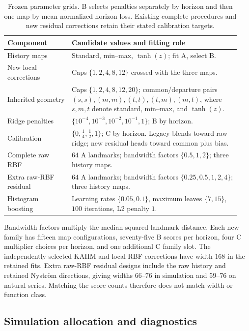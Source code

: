 \begin{table}[t]
\centering\small
\caption{Frozen parameter grids. B selects penalties separately by
horizon and then one map by mean normalized horizon loss. Existing
complete procedures and new residual corrections retain their stated
calibration targets.}
\label{supp:pa-grids}
\begin{tabular}{@{}p{0.26\linewidth}p{0.68\linewidth}@{}}
\toprule
Component & Candidate values and fitting role \\
\midrule
History maps & Standard, min--max, $\tanh(z)$; fit A, select B. \\
New local corrections & Caps $\{1,2,4,8,12\}$ crossed with the three maps. \\
Inherited geometry & Caps $\{1,2,4,8,12,20\}$; common/departure pairs
$(s,s),(m,m),(t,t),(t,m),(m,t)$, where $s,m,t$ denote standard,
min--max, and $\tanh(z)$. \\
Ridge penalties & $\{10^{-4},10^{-3},10^{-2},10^{-1},1\}$; B by horizon. \\
Calibration & $\{0,\tfrac14,\tfrac12,1\}$; C by horizon. Legacy blends
toward raw ridge; new residual heads toward common plus bias. \\
Complete raw RBF & $64$ A landmarks; bandwidth factors
$\{0.5,1,2\}$; three history maps. \\
Extra raw-RBF residual & $64$ A landmarks; bandwidth factors
$\{0.25,0.5,1,2,4\}$; three history maps. \\
Histogram boosting & Learning rates $\{0.05,0.1\}$, maximum leaves
$\{7,15\}$, $100$ iterations, L2 penalty $1$. \\
\bottomrule
\end{tabular}
\end{table}

Bandwidth factors multiply the median squared landmark distance.
Each new family has fifteen map configurations, seventy-five B scores
per horizon, four C multiplier choices per horizon, and one additional
C family slot. The independently selected KAHM and local-RBF corrections
have width $168$ in the retained fits. Extra raw-RBF residual designs
include the raw history and retained Nystr\"om directions, giving widths
$66$--$76$ in simulation and $59$--$76$ on natural series. Matching the
score counts therefore does not match width or function class.

\subsection{Simulation allocation and diagnostics}

